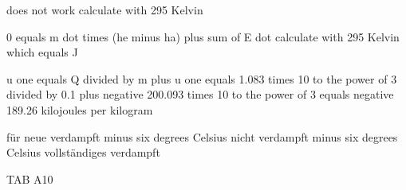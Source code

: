 does not work calculate with 295 Kelvin

0 equals m dot times (he minus ha) plus sum of E dot calculate with 295 Kelvin which equals J

u one equals Q divided by m plus u one equals 1.083 times 10 to the power of 3 divided by 0.1 plus negative 200.093 times 10 to the power of 3 equals negative 189.26 kilojoules per kilogram

für neue verdampft
minus six degrees Celsius nicht verdampft
minus six degrees Celsius vollständiges verdampft

TAB A10